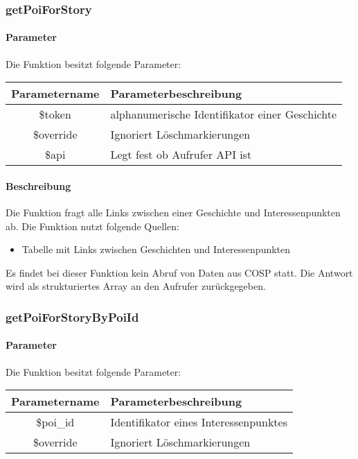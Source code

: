 \subsubsection{getPoiForStory}
\paragraph{Parameter} Die Funktion besitzt folgende Parameter:
\begin{table}[H]
	\begin{tabular}{|c|p{11cm}|}
		\hline
		\textbf{Parametername} & \textbf{Parameterbeschreibung} \\ \hline
		\$token    & alphanumerische Identifikator einer Geschichte \\ \hline
		\$override & Ignoriert Löschmarkierungen \\ \hline
		\$api      & Legt fest ob Aufrufer API ist \\ \hline
	\end{tabular}
\end{table}
\paragraph{Beschreibung} Die Funktion fragt alle Links zwischen einer Geschichte und Interessenpunkten ab. Die Funktion nutzt folgende Quellen:
\begin{itemize}
	\item Tabelle mit Links zwischen Geschichten und Interessenpunkten
\end{itemize}
Es findet bei dieser Funktion kein Abruf von Daten aus {\glqq COSP\grqq} statt. Die Antwort wird als strukturiertes Array an den Aufrufer zurückgegeben.
\subsubsection{getPoiForStoryByPoiId}
\paragraph{Parameter} Die Funktion besitzt folgende Parameter:
\begin{table}[H]
	\begin{tabular}{|c|p{11cm}|}
		\hline
		\textbf{Parametername} & \textbf{Parameterbeschreibung} \\ \hline
		\$poi\_id  & Identifikator eines Interessenpunktes \\ \hline
		\$override & Ignoriert Löschmarkierungen \\ \hline
	\end{tabular}
\end{table}
